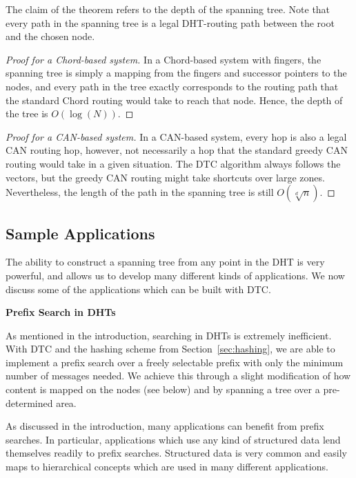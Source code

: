 \documentclass[fleqn,12pt,twoside]{article}
\begin{document}
The claim of the theorem refers to the depth of the spanning tree.
Note that every path in the spanning tree is a legal DHT-routing path
between the root and the chosen node.


\begin{proof}[Proof for a Chord-based system]
  In a Chord-based system with fingers, the spanning tree is simply a
  mapping from the fingers and successor pointers to the nodes, and
  every path in the tree exactly corresponds to the routing path that the 
  standard Chord routing would take to reach that node. Hence, the
  depth of the tree is $O(\log(N))$.
\end{proof}

\begin{proof}[Proof for a CAN-based system]
  In a CAN-based system, every hop is also a legal CAN routing hop,
  however, not necessarily a hop that the standard greedy CAN routing
  would take in a given situation. The DTC algorithm always follows the
  vectors, but the greedy CAN routing might take shortcuts over large
  zones.  Nevertheless, the length of the path in the spanning tree is
  still $O(\sqrt[d]{n})$.
\end{proof}


\subsection{Sample Applications}
\label{sec:sample-applications}

The ability to construct a spanning tree from any point in the DHT is
very powerful, and allows us to develop many different kinds of
applications. We now discuss some of the applications which can be
built with DTC.

\noindent
\textbf{Prefix Search in DHTs}

As mentioned in the introduction, searching in DHTs is extremely
inefficient. With DTC and the hashing scheme from
Section~\ref{sec:hashing}, we are able to implement a prefix search
over a freely selectable prefix with only the minimum number of
messages needed. We achieve this through a slight modification of how
content is mapped on the nodes (see below) and by spanning a tree over
a pre-determined area.

As discussed in the introduction, many applications can benefit from
prefix searches. In particular, applications which use any kind of
structured data lend themselves readily to prefix searches. Structured
data is very common and easily maps to hierarchical concepts which are
used in many different applications.
\end{document}
